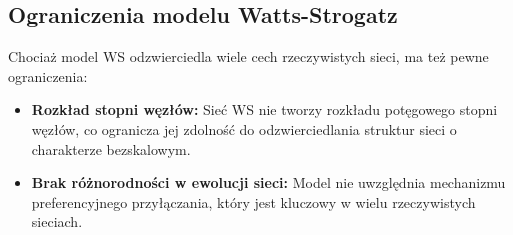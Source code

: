 \subsection{Ograniczenia modelu Watts-Strogatz}
Chociaż model WS odzwierciedla wiele cech rzeczywistych sieci, ma też pewne ograniczenia:
\begin{itemize}
    \item \textbf{Rozkład stopni węzłów:} Sieć WS nie tworzy rozkładu potęgowego stopni węzłów, co ogranicza jej zdolność do odzwierciedlania struktur sieci o charakterze bezskalowym.
    \item \textbf{Brak różnorodności w ewolucji sieci:} Model nie uwzględnia mechanizmu preferencyjnego przyłączania, który jest kluczowy w wielu rzeczywistych sieciach.
\end{itemize}
